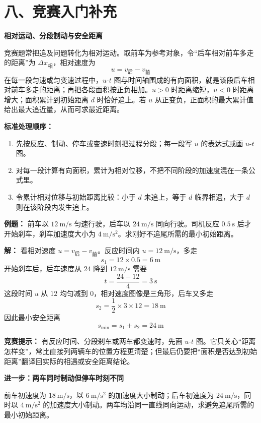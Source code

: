 \section*{八、竞赛入门补充}

\begin{competitionbox}
\textbf{相对运动、分段制动与安全距离}

竞赛题常把追及问题转化为相对运动。取前车为参考对象，令“后车相对前车多走的距离”为 $\Delta x_{\text{相}}$，相对速度为
\[
u=v_{\text{后}}-v_{\text{前}}
\]
在每一段匀速或匀变速过程中，$u$-$t$ 图与时间轴围成的有向面积，就是该段后车相对前车多走的距离；再把各段面积按正负相加。$u>0$ 时距离缩短，$u<0$ 时距离增大；面积累计到初始距离 $d$ 时恰好追上。若 $u$ 从正变负，正面积的最大累计值给出最大追近量，从而可求最近距离。

\textbf{标准处理顺序：}
\begin{enumerate}
  \item 先按反应、制动、停车或变速时刻把过程分段；每一段写 $u$ 的表达式或画 $u$-$t$ 图。
  \item 对每一段计算有向面积，累计为相对位移，不把不同阶段的加速度混在一条公式里。
  \item 令累计相对位移与初始距离比较：小于 $d$ 未追上，等于 $d$ 临界相遇，大于 $d$ 则在该阶段内发生追上。
\end{enumerate}

\textbf{例题：} 前车以 $12\ \mathrm{m/s}$ 匀速行驶，后车以 $24\ \mathrm{m/s}$ 同向行驶。司机反应 $0.5\ \mathrm{s}$ 后才开始刹车，刹车加速度大小为 $4\ \mathrm{m/s^2}$。求刚好不追尾所需的最小初始距离。

\textbf{解：} 看相对速度 $u=v_{\text{后}}-v_{\text{前}}$。反应时间内 $u=12\ \mathrm{m/s}$，多走
\[
s_1=12\times 0.5=6\ \mathrm{m}
\]
开始刹车后，后车速度从 $24$ 降到 $12\ \mathrm{m/s}$ 需要
\[
t=\frac{24-12}{4}=3\ \mathrm{s}
\]
这段时间 $u$ 从 $12$ 均匀减到 $0$，相对速度图像是三角形，后车又多走
\[
s_2=\frac12\times 3\times 12=18\ \mathrm{m}
\]
因此最小安全距离
\[
s_{\min}=s_1+s_2=24\ \mathrm{m}
\]

\textbf{竞赛提示：} 有反应时间、分段刹车或两车都变速时，先画 $u$-$t$ 图。它只关心“距离怎样变”，常比直接列两辆车的位置方程更清楚；但最后仍要把“面积是否达到初始距离”翻译回实际的相遇或安全距离结论。

\medskip
\textbf{进一步：两车同时制动但停车时刻不同}

前车初速度为 $18\ \mathrm{m/s}$，以 $6\ \mathrm{m/s^2}$ 的加速度大小制动；后车初速度为 $24\ \mathrm{m/s}$，同时以 $4\ \mathrm{m/s^2}$ 的加速度大小制动。两车均沿同一直线同向运动，求避免追尾所需的最小初始距离。


\end{competitionbox}
